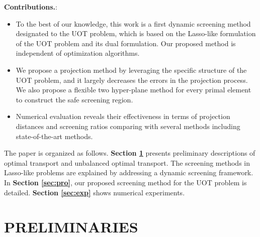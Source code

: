 \documentclass[twoside]{article}
\theoremstyle{plain}
\begin{document}
\textbf{Contributions.}: 
\begin{itemize}
\item To the best of our knowledge, this work is a first dynamic screening method designated to the UOT problem, which is based on the Lasso-like formulation of the UOT problem and its dual formulation. Our proposed method is independent of optimization algorithms.
\item We propose a projection method by leveraging the specific structure of the UOT problem, and it largely decreases the errors in the projection process. 
We also propose a flexible two hyper-plane method  for every primal element to construct the safe screening region.
\item Numerical evaluation reveals their effectiveness in terms of projection distances and screening ratios comparing with several methods including state-of-the-art methods.
\end{itemize}


The paper is organized as follows. {\bf Section \ref{sec:pre}} presents preliminary descriptions of optimal transport and unbalanced optimal transport. The screening methods in Lasso-like problems are explained by addressing a dynamic screening framework. In {\bf Section \ref{sec:pro}}, our proposed screening method for the UOT problem is detailed. {\bf Section \ref{sec:exp}} shows numerical experiments.

\section{PRELIMINARIES}
\label{sec:pre}
\end{document}

